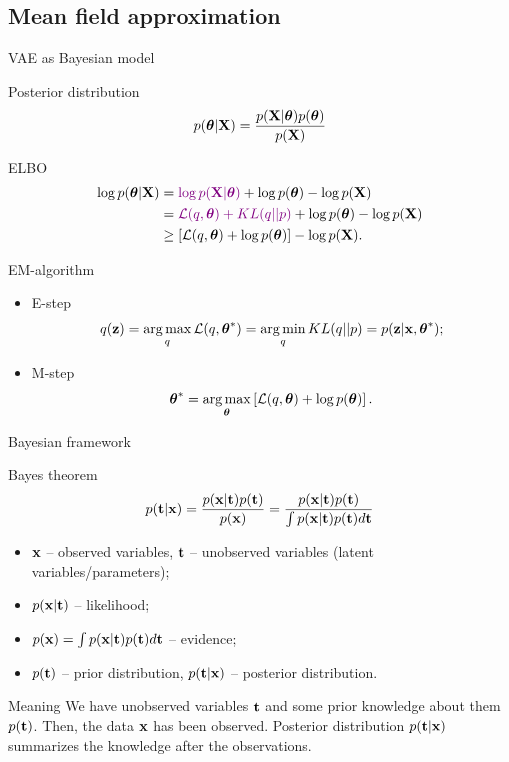 \documentclass{beamer}
\begin{document}
\subsection{Mean field approximation}
\begin{frame}{VAE as Bayesian model}
	\begin{block}{Posterior distribution}
		\vspace{-0.2cm}
		\[
		p(\boldsymbol{\theta} | \mathbf{X}) = \frac{p(\mathbf{X} | \boldsymbol{\theta}) p(\boldsymbol{\theta})}{p(\mathbf{X})}
		\]
		\vspace{-0.5cm}
	\end{block}
	\begin{block}{ELBO}
		\vspace{-0.5cm}
		\begin{align*}
			\log p(\boldsymbol{\theta} | \mathbf{X}) &= {\color{violet}\log p(\mathbf{X} | \boldsymbol{\theta})} + \log p(\boldsymbol{\theta}) - \log p(\mathbf{X}) \\
			&= {\color{violet}\mathcal{L}(q, \boldsymbol{\theta}) + KL(q || p)} + \log p(\boldsymbol{\theta}) - \log p(\mathbf{X}) \\
			&\geq \left[ \mathcal{L}(q, \boldsymbol{\theta}) + \log p(\boldsymbol{\theta}) \right] - \log p(\mathbf{X}) .
		\end{align*}
		\vspace{-0.7cm}
	\end{block}
	\begin{block}{EM-algorithm}
		\begin{itemize}
			\item E-step
			\vspace{-0.2cm}
			\[
			q(\mathbf{z}) = \operatorname*{arg\,max}_q \mathcal{L} (q, \boldsymbol{\theta}^*) = \operatorname*{arg\,min}_q KL(q || p) =
			p(\mathbf{z}| \mathbf{x}, \boldsymbol{\theta}^*);
			\]
			\vspace{-0.5cm}
			\item M-step
			\[
			\boldsymbol{\theta}^* = \operatorname*{arg\,max}_{\boldsymbol{\theta}} \left[ \mathcal{L} (q, \boldsymbol{\theta}) + \log p(\boldsymbol{\theta}) \right].
			\]
		\end{itemize}
	\end{block}
\end{frame}
\begin{frame}{Bayesian framework}
	\begin{block}{Bayes theorem}
		\[
			p(\mathbf{t} | \mathbf{x}) = \frac{p(\mathbf{x} | \mathbf{t}) p(\mathbf{t})}{p(\mathbf{x})} = \frac{p(\mathbf{x} | \mathbf{t}) p(\mathbf{t})}{\int p(\mathbf{x} | \mathbf{t}) p(\mathbf{t}) d \mathbf{t}} 
		\]
		\begin{itemize}
			\item $\mathbf{x}$ -- observed variables, $\mathbf{t}$ -- unobserved variables (latent variables/parameters);
			\item $p(\mathbf{x} | \mathbf{t})$ -- likelihood;
			\item $p(\mathbf{x}) = \int p(\mathbf{x} | \mathbf{t}) p(\mathbf{t}) d \mathbf{t}$ -- evidence;
			\item $p(\mathbf{t})$ -- prior distribution, $p(\mathbf{t} | \mathbf{x})$ -- posterior distribution.
		\end{itemize}
	\end{block}
	\begin{block}{Meaning}
		We have unobserved variables $\mathbf{t}$ and some prior knowledge about them $p(\mathbf{t})$. Then, the data $\mathbf{x}$ has been observed. 
		Posterior distribution $p(\mathbf{t} | \mathbf{x})$ summarizes the knowledge after the observations.
	\end{block}
\end{frame}
\end{document}
